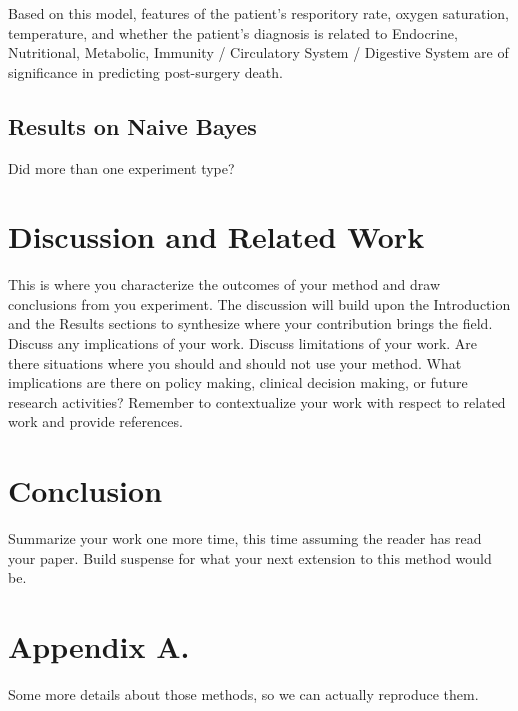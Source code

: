 \documentclass[twoside,11pt]{article}
\begin{document}
Based on this model, features of the patient's resporitory rate, oxygen saturation, temperature, and whether the patient's diagnosis is related to Endocrine, Nutritional, Metabolic, Immunity / Circulatory System / Digestive System are of significance in predicting post-surgery death.

\subsection{Results on Naive Bayes} 

Did more than one experiment type?

\section{Discussion and Related Work} 

This is where you characterize the outcomes of your method and draw conclusions from you experiment.
The discussion will build upon the Introduction and the Results sections to synthesize where your contribution brings the field. Discuss any implications of your work. 
Discuss limitations of your work.
Are there situations where you should and should not use your method.
What implications are there on policy making, clinical decision making, or future research activities?
Remember to contextualize your work with respect to related work and provide references.

\section{Conclusion} 
Summarize your work one more time, this time assuming the reader has read your paper.
Build suspense for what your next extension to this method would be.




\appendix
\section*{Appendix A.}
Some more details about those methods, so we can actually reproduce them.
\end{document}
